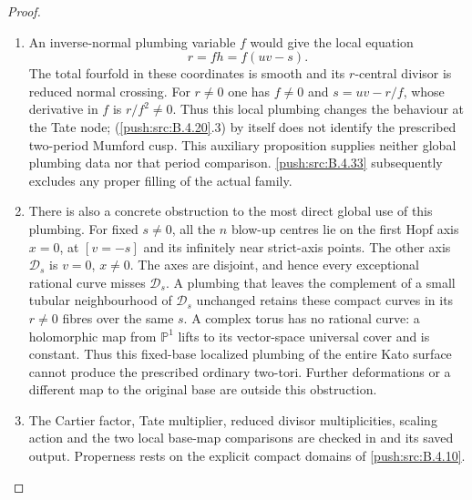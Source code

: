 \begin{proof}
\begin{enumerate}[label=\arabic*.,leftmargin=*]
\item An inverse-normal plumbing variable $f$ would
give the local equation
\[
 r=fh=f(uv-s).
 \tag{B.4.20.3}
\]
The total fourfold in these coordinates is
smooth and its $r$-central divisor is reduced
normal crossing. For $r\ne0$ one has $f\ne0$
and $s=uv-r/f$, whose derivative in $f$ is
$r/f^2\ne0$. Thus this local plumbing changes
the behaviour at the Tate node; (\ref{push:src:B.4.20}.3) by
itself does not identify the prescribed two-period
Mumford cusp. This auxiliary proposition supplies neither
global plumbing data nor that period comparison. \ref{push:src:B.4.33}
subsequently excludes any proper filling of the actual family.

\item There is also a concrete obstruction to the most
direct global use of this plumbing. For fixed
$s\ne0$, all the $n$ blow-up centres lie on the
first Hopf axis $x=0$, at $[v=-s]$ and its
infinitely near strict-axis points. The other
axis $\mathcal D_s$ is $v=0$, $x\ne0$.
The axes are disjoint, and hence every exceptional
rational curve misses $\mathcal D_s$. A plumbing
that leaves the complement of a small tubular
neighbourhood of $\mathcal D_s$ unchanged retains
these compact curves in its $r\ne0$ fibres over
the same $s$. A complex torus has no rational
curve: a holomorphic map from $\mathbb P^1$
lifts to its vector-space universal cover and
is constant. Thus this fixed-base localized
plumbing of the entire Kato surface cannot
produce the prescribed ordinary two-tori.
Further deformations or a different map to the
original base are outside this obstruction.

\item The Cartier factor, Tate multiplier, reduced
divisor multiplicities, scaling action and the
two local base-map comparisons are checked in
 and
its saved output. Properness rests on the
explicit compact domains of \ref{push:src:B.4.10}.
\end{enumerate}
\end{proof}

